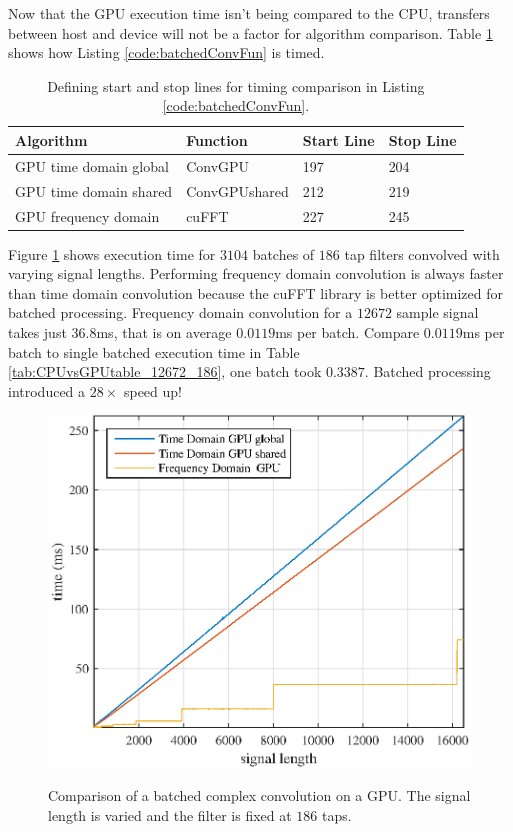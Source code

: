 Now that the GPU execution time isn't being compared to the CPU, transfers between host and device will not be a factor for algorithm comparison.
Table \ref{tab:BatchedGPUtimingTable} shows how Listing \ref{code:batchedConvFun} is timed.
\begin{table}
\caption{Defining start and stop lines for timing comparison in Listing \ref{code:batchedConvFun}.}
\begin{center}
\begin{tabular}{llll}
	\toprule
	Algorithm 				& Function		& Start Line	& Stop  Line		\\ \midrule
	GPU time domain global 	& ConvGPU 		& 197			& 204				\\
	GPU time domain shared 	& ConvGPUshared & 212			& 219				\\
	GPU frequency domain 	& cuFFT			& 227			& 245				\\ 
	\bottomrule
\end{tabular}
\end{center}
\label{tab:BatchedGPUtimingTable}
\end{table}


Figure \ref{fig:CPUvsGPU_3104batch_186taps_varySignal} shows execution time for $3104$ batches of $186$ tap filters convolved with varying signal lengths.
Performing frequency domain convolution is always faster than time domain convolution because the cuFFT library is better optimized for batched processing.
Frequency domain convolution for a $12672$ sample signal takes just $36.8$ms, that is on average $0.0119$ms per batch.
Compare $0.0119$ms per batch to single batched execution time in Table \ref{tab:CPUvsGPUtable_12672_186}, one batch took $0.3387$.
Batched processing introduced a $28\times$ speed up!
\begin{figure}
	\caption{Comparison of a batched complex convolution on a GPU. The signal length is varied and the filter is fixed at $186$ taps.}
	\centering\includegraphics[width=5in]{figures/gpu_intro/CPUvsGPU_3104batch_186taps_varySignal.eps}
	\label{fig:CPUvsGPU_3104batch_186taps_varySignal}
\end{figure}

